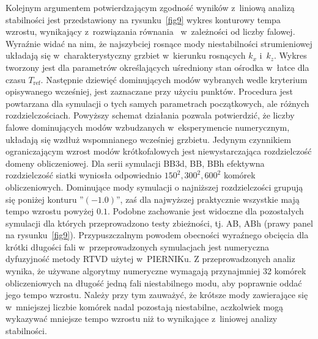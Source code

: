 \par Kolejnym argumentem potwierdzającym zgodność wyników z~liniową analizą
stabilności jest przedstawiony na rysunku~\ref{fig9} wykres konturowy tempa
wzrostu, wynikający z~rozwiązania równania~ w~zależności od
liczby falowej. Wyraźnie widać na nim, że najszybciej rosnące mody
niestabilności strumieniowej układają się w~charakterystyczny grzbiet w~kierunku
rosnących $k_x$ i~$k_z$.  Wykres tworzony jest dla parametrów określających
uśredniony stan ośrodka w~łatce dla czasu $T_{\textrm{ref}}$.  Następnie
dziewięć dominujących modów wybranych wedle kryterium opisywanego wcześniej,
jest zaznaczane przy użyciu punktów. Procedura jest powtarzana dla symulacji o
tych samych parametrach początkowych, ale różnych rozdzielczościach.  Powyższy
schemat działania pozwala potwierdzić, że liczby falowe dominujących modów
wzbudzanych w~eksperymencie numerycznym, układają się wzdłuż wspomnianego
wcześniej grzbietu. Jedynym czynnikiem ograniczającym wzrost modów
krótkofalowych jest niewystarczająca rozdzielczość domeny obliczeniowej. Dla
serii symulacji BB3d, BB, BBh efektywna rozdzielczość siatki wyniosła
odpowiednio $150^2, 300^2, 600^2$ komórek obliczeniowych.  Dominujące mody
symulacji o najniższej rozdzielczości grupują się poniżej konturu ''$(-1.0)$'',
zaś dla najwyższej praktycznie wszystkie mają tempo wzrostu powyżej $0.1$.
Podobne zachowanie jest widoczne dla pozostałych symulacji dla których
przeprowadzono testy zbieżności, tj. AB, ABh (prawy panel na
rysunku~\ref{fig9}). Przypuszczalnym powodem obecności wyraźnego obcięcia dla
krótki długości fali w~przeprowadzonych symulacjach jest numeryczna
dyfuzyjność metody RTVD użytej w~PIERNIKu. Z przeprowadzonych analiz wynika, że
używane algorytmy numeryczne wymagają przynajmniej 32 komórek obliczeniowych
na długość jedną fali niestabilnego modu, aby poprawnie oddać jego tempo
wzrostu.  Należy przy tym zauważyć, że krótsze mody zawierające się w~mniejszej
liczbie komórek nadal pozostają niestabilne, aczkolwiek mogą wykazywać mniejsze
tempo wzrostu niż to wynikające z~liniowej analizy stabilności.
%
